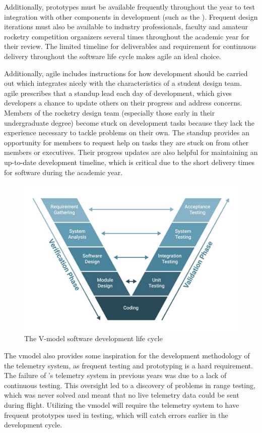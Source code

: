 Additionally, prototypes must be available frequently throughout the year to test integration with other components in
development (such as the  ). Frequent design iterations must also be available to
industry professionals, faculty and amateur rocketry competition organizers several times throughout the academic year
for their review. The limited timeline for deliverables and requirement for continuous delivery throughout the software
life cycle makes \gls{agile} an ideal choice.

Additionally, \gls{agile} includes instructions for how development should be carried out which integrates nicely with
the characteristics of a student design team. \Gls{agile} prescribes that a \gls{standup} lead each day of development,
which gives developers a chance to update others on their progress and address concerns. Members of the
 rocketry design team (especially those early in their undergraduate degree) become stuck on
development tasks because they lack the experience necessary to tackle problems on their own. The \gls{standup}
provides an opportunity for members to request help on tasks they are stuck on from other members or executives. Their
progress updates are also helpful for maintaining an up-to-date development timeline, which is critical due to the
short delivery times for software during the academic year.

\begin{figure}[H]
    \centerline{\includegraphics[width=0.7\linewidth]{assets/v-model.jpg}}
    \caption{The V-model software development life cycle \cite{vmodel}}
\end{figure}

The \gls{vmodel} also provides some inspiration for the development methodology of the telemetry system, as frequent
testing and prototyping is a hard requirement. The failure of 's telemetry system in previous
years was due to a lack of continuous testing. This oversight led to a discovery of problems in range testing, which
was never solved and meant that no live telemetry data could be sent during flight. Utilizing the \gls{vmodel} will
require the telemetry system to have frequent prototypes used in testing, which will catch errors earlier in the
development cycle.

